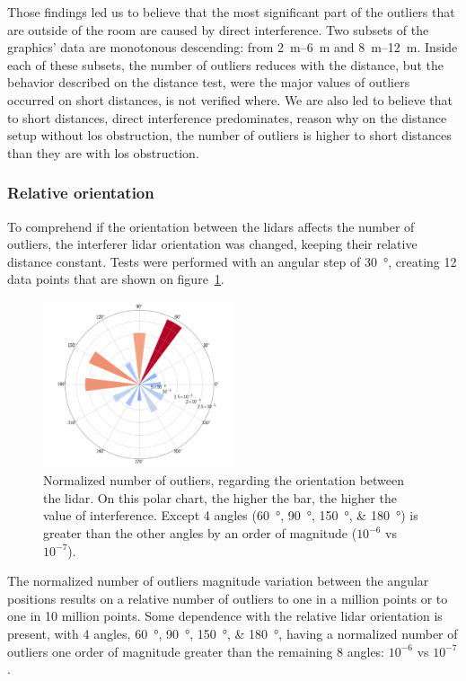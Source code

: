 Those findings led us to believe that the most significant part of the outliers that are outside of the room are caused by direct interference. Two subsets of the graphics' data are monotonous descending: from \SIrange{2}{6}{\meter} and \SIrange{8}{12}{\meter}. Inside each of these subsets, the number of outliers reduces with the distance, but the behavior described on the distance test, were the major values of outliers occurred on short distances, is not verified where. We are also led to believe that to short distances, direct interference predominates, reason why on the distance setup without \ac{los} obstruction, the number of outliers is higher to short distances than they are with \ac{los} obstruction.

\subsubsection{Relative orientation}
To comprehend if the orientation between the \acp{lidar} affects the number of outliers, the interferer \ac{lidar} orientation was changed, keeping their relative distance constant. Tests were performed with an angular step of \SI{30}{\degree}, creating 12 data points that are shown on figure~\ref{fig:box-filter-outliers-direction}.

\begin{figure}[!ht]
\centering
\includegraphics[width=0.5\textwidth]{img/lidar-interference/box-filtering/interference-box-filter-outliers-direction.png}
\caption{Normalized number of outliers, regarding the orientation between the \ac{lidar}. On this polar chart, the higher the bar, the higher the value of interference. Except 4 angles (\SIlist[list-final-separator = {, }]{60; 90; 150; 180}{\degree}) is greater than the other angles by an order of magnitude ($10^{-6}$ vs $10^{-7}$).}
\label{fig:box-filter-outliers-direction}
\end{figure}

The normalized number of outliers magnitude variation between the angular positions results on a relative number of outliers to one in a million points or to one in 10 million points. Some dependence with the relative \ac{lidar} orientation is present, with 4 angles, \SIlist[list-final-separator = {, }]{60; 90; 150; 180}{\degree}, having a normalized number of outliers one order of magnitude greater than the remaining 8 angles: $10^{-6}$ vs $10^{-7}$.

